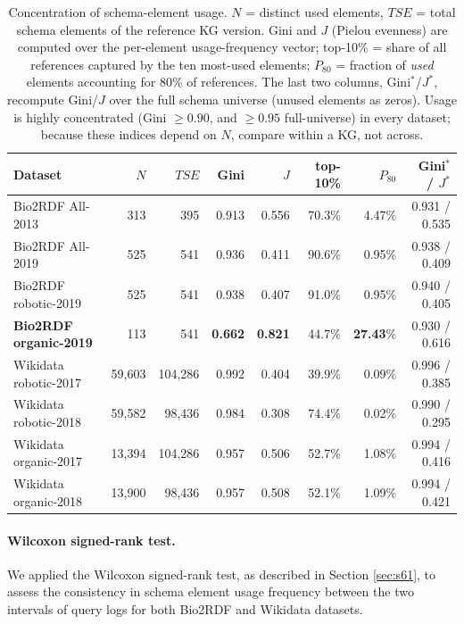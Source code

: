 \documentclass[sw]{iosart2x}
\begin{document}
\begin{table}[ht]
\centering
\caption{Concentration of schema-element usage. $N$ = distinct used elements, $TSE$ = total schema elements of the reference KG version. Gini and $J$ (Pielou evenness) are computed over the per-element usage-frequency vector; top-10\% = share of all references captured by the ten most-used elements; $P_{80}$ = fraction of \emph{used} elements accounting for 80\% of references. The last two columns, Gini$^{\ast}$/$J^{\ast}$, recompute Gini/$J$ over the full schema universe (unused elements as zeros). Usage is highly concentrated (Gini $\geq 0.90$, and $\geq 0.95$ full-universe) in every dataset; because these indices depend on $N$, compare within a KG, not across.}
\label{tab:concentration}
\begin{tabular}{l|r|r|r|r|r|r|r}
\hline
Dataset & $N$ & $TSE$ & Gini & $J$ & top-10\% & $P_{80}$ & Gini$^{\ast}$ / $J^{\ast}$ \\
\hline
Bio2RDF All-2013 & 313 & 395 & 0.913 & 0.556 & 70.3\% & 4.47\% & 0.931 / 0.535 \\
Bio2RDF All-2019 & 525 & 541 & 0.936 & 0.411 & 90.6\% & 0.95\% & 0.938 / 0.409 \\
Bio2RDF robotic-2019 & 525 & 541 & 0.938 & 0.407 & 91.0\% & 0.95\% & 0.940 / 0.405 \\
\textbf{Bio2RDF organic-2019} & 113 & 541 & \textbf{0.662} & \textbf{0.821} & 44.7\% & \textbf{27.43}\% & 0.930 / 0.616 \\
Wikidata robotic-2017 & 59{,}603 & 104{,}286 & 0.992 & 0.404 & 39.9\% & 0.09\% & 0.996 / 0.385 \\
Wikidata robotic-2018 & 59{,}582 & 98{,}436 & 0.984 & 0.308 & 74.4\% & 0.02\% & 0.990 / 0.295 \\
Wikidata organic-2017 & 13{,}394 & 104{,}286 & 0.957 & 0.506 & 52.7\% & 1.08\% & 0.994 / 0.416 \\
Wikidata organic-2018 & 13{,}900 & 98{,}436 & 0.957 & 0.508 & 52.1\% & 1.09\% & 0.994 / 0.421 \\
\hline
\end{tabular}
\end{table}

\paragraph{\textbf{Wilcoxon signed-rank test.}}We applied the Wilcoxon signed-rank test, as described in Section \ref{sec:s61}, to assess the consistency in schema element usage frequency between the two intervals of query logs for both Bio2RDF and Wikidata datasets.
\end{document}
